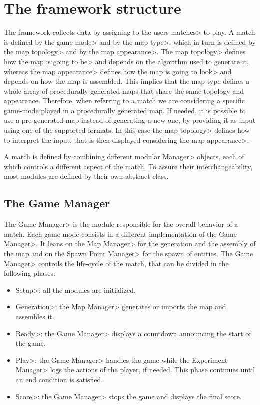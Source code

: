 
\section{The framework structure}

The framework collects data by assigning to the users \<matches> to play. A match is defined by the \<game mode> and by the \<map type>: which in turn is defined by the \<map topology> and by the \<map appearance>. The \<map topology> defines how the map is going to \<be> and depends on the algorithm used to generate it, whereas the \<map appearance> defines how the map is going to \<look> and depends on how the map is assembled. This implies that the map type defines a whole array of procedurally generated maps that share the same topology and appearance. Therefore, when referring to a match we are considering a specific game-mode played in a procedurally generated map. If needed, it is possible to use a pre-generated map instead of generating a new one, by providing it as input using one of the supported formats. In this case the \<map topology> defines how to interpret the input, that is then displayed considering the \<map appearance>.

\par

A match is defined by combining different modular \<Manager> objects, each of which controls a different aspect of the match. To assure their interchangeability, most modules are defined by their own abstract class.


\subsection{The Game Manager}

The \<Game Manager> is the module responsible for the overall behavior of a match. Each game mode consists in a different implementation of the \<Game Manager>. It leans on the \<Map Manager> for the generation and the assembly of the map and on the \<Spawn Point Manager> for the spawn of entities. The \<Game Manager> controls the life-cycle of the match, that can be divided in the following phases:

\begin{itemize}
\item \<Setup>: all the modules are initialized.
\item \<Generation>: the \<Map Manager> generates or imports the map and assembles it.
\item \<Ready>: the \<Game Manager> displays a countdown announcing the start of the game.
\item \<Play>: the \<Game Manager> handles the game while the \<Experiment Manager> logs the actions of the player, if needed. This phase continues until an end condition is satisfied.
\item \<Score>: the \<Game Manager> stops the game and displays the final score.
\end{itemize}

